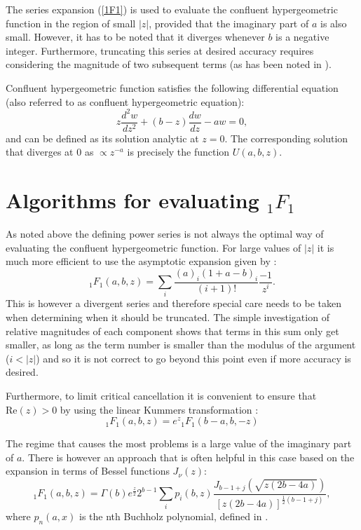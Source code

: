 The series expansion (\ref{1F1}) is used to evaluate the confluent hypergeometric function in the region of small $|z|$, provided that the imaginary part of $a$ is also small. However, it has to be noted that it diverges whenever $b$ is a negative integer. Furthermore, truncating this series at desired accuracy requires considering the magnitude of two subsequent terms (as has been noted in \cite{Pearson2017}).

Confluent hypergeometric function satisfies the following differential equation (also referred to as confluent hypergeometric equation):
		\begin{equation}
		z \frac{d^2 w}{dz^2} + (b-z)\frac{dw}{dz} -a w = 0 ,
		\end{equation}
and can be defined as its solution analytic at $z=0$. The corresponding solution that diverges at 0 as $\propto z^{-a}$	is precisely the function $U(a,b,z)$.

\section{Algorithms for evaluating ${_1F_1}$}
		
		As noted above the defining power series is not always the optimal way of evaluating the confluent hypergeometric function. For large values of $|z|$ it is much more efficient to use the asymptotic expansion given by \cite{hazewinkel1993encyclopaedia}:
		\begin{equation}
		_1F_1(a,b,z) = \sum_i \frac{(a)_i (1+a-b)_i}{(i+1)!} \frac{-1}{z^i} .
		\end{equation}
		This is however a divergent series and therefore special care needs to be taken when determining when it should be truncated. The simple investigation of relative magnitudes of each component shows that terms in this sum only get smaller, as long as the term number is smaller than the modulus of the argument ($i<|z|$) and so it is not correct to go beyond this point even if more accuracy is desired.
			
		Furthermore, to limit critical cancellation it is convenient to ensure that $\text{Re}(z)>0$ by using the linear Kummers transformation \cite{AS}:
		\begin{equation}
		_1F_1(a,b,z) = e^z {_1F_1}(b-a,b,-z)
		\end{equation}
		
		The regime that causes the most problems is a large value of the imaginary part of $a$. There is however an approach that is often helpful in this case based on the expansion in terms of Bessel functions $J_{\nu}(z)$:		
		\begin{equation}
		_1F_1(a,b,z) = \Gamma(b) e^{\frac{z}{2}} 2^{b-1} \sum_i p_i(b,z) \frac{J_{b-1+j}(\sqrt{z(2b-4a)})}{[z(2b-4a)]^{\frac{1}{2}(b-1+j)}} ,
		\end{equation}
		where $p_n(a,x)$ is the nth Buchholz polynomial, defined in \cite{ABAD1999237}.
		
